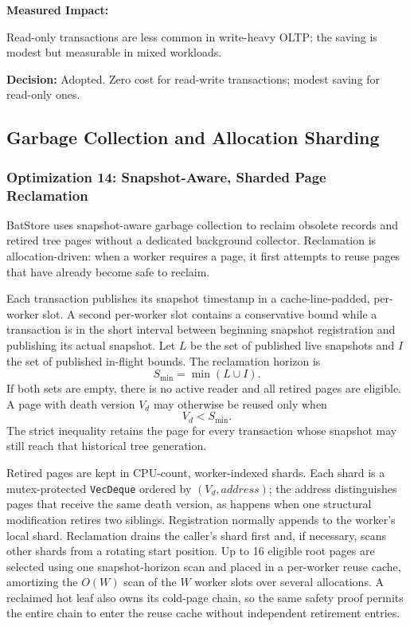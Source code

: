 \documentclass[11pt]{article}
\newcommand{\code}[1]{\texttt{#1}}
\begin{document}
\textbf{Measured Impact:}

Read-only transactions are less common in write-heavy OLTP; the saving is modest
but measurable in mixed workloads.

\textbf{Decision:} Adopted. Zero cost for read-write transactions; modest saving for
read-only ones.

\subsection{Garbage Collection and Allocation Sharding}
\label{sec:gc_optimizations}

\subsubsection{Optimization 14: Snapshot-Aware, Sharded Page Reclamation}

BatStore uses snapshot-aware garbage collection to reclaim obsolete records and retired
tree pages without a dedicated background collector. Reclamation is allocation-driven:
when a worker requires a page, it first attempts to reuse pages that have already become
safe to reclaim.

Each transaction publishes its snapshot timestamp in a cache-line-padded, per-worker
slot. A second per-worker slot contains a conservative bound while a transaction is in
the short interval between beginning snapshot registration and publishing its actual
snapshot. Let $L$ be the set of published live snapshots and $I$ the set of published
in-flight bounds. The reclamation horizon is
\begin{equation}
  S_{\min} = \min(L \cup I).
  \label{eq:gc-horizon}
\end{equation}
If both sets are empty, there is no active reader and all retired pages are eligible.
A page with death version $V_d$ may otherwise be reused only when
\begin{equation}
  V_d < S_{\min}.
  \label{eq:gc-rule}
\end{equation}
The strict inequality retains the page for every transaction whose snapshot may still
reach that historical tree generation.

Retired pages are kept in CPU-count, worker-indexed shards. Each shard is a
mutex-protected \code{VecDeque} ordered by $(V_d,\mathit{address})$; the address
distinguishes pages that receive the same death version, as happens when one structural
modification retires two siblings. Registration normally appends to the worker's local
shard. Reclamation drains the caller's shard first and, if necessary, scans other shards
from a rotating start position. Up to 16 eligible root pages are selected using one
snapshot-horizon scan and placed in a per-worker reuse cache, amortizing the
$O(W)$ scan of the $W$ worker slots over several allocations. A reclaimed hot leaf also
owns its cold-page chain, so the same safety proof permits the entire chain to enter the
reuse cache without independent retirement entries.
\end{document}

